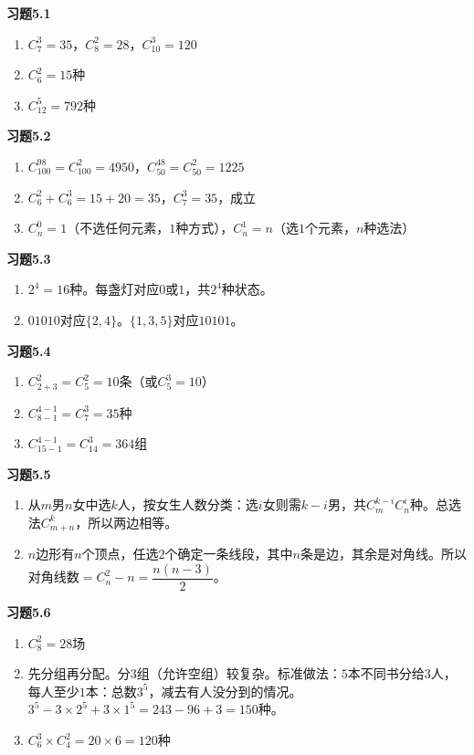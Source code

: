 
\textbf{习题5.1}
\begin{enumerate}
\item $C_7^3=35$，$C_8^2=28$，$C_{10}^3=120$
\item $C_6^2=15$种
\item $C_{12}^5=792$种
\end{enumerate}

\textbf{习题5.2}
\begin{enumerate}
\item $C_{100}^{98}=C_{100}^2=4950$，$C_{50}^{48}=C_{50}^2=1225$
\item $C_6^2+C_6^3=15+20=35$，$C_7^3=35$，成立
\item $C_n^0=1$（不选任何元素，$1$种方式），$C_n^1=n$（选$1$个元素，$n$种选法）
\end{enumerate}

\textbf{习题5.3}
\begin{enumerate}
\item $2^4=16$种。每盏灯对应$0$或$1$，共$2^4$种状态。
\item $01010$对应$\{2,4\}$。$\{1,3,5\}$对应$10101$。
\end{enumerate}

\textbf{习题5.4}
\begin{enumerate}
\item $C_{2+3}^2=C_5^2=10$条（或$C_{5}^3=10$）
\item $C_{8-1}^{4-1}=C_7^3=35$种
\item $C_{15-1}^{4-1}=C_{14}^3=364$组
\end{enumerate}

\textbf{习题5.5}
\begin{enumerate}
\item 从$m$男$n$女中选$k$人，按女生人数分类：选$i$女则需$k-i$男，共$C_m^{k-i}C_n^i$种。总选法$C_{m+n}^k$，所以两边相等。
\item $n$边形有$n$个顶点，任选$2$个确定一条线段，其中$n$条是边，其余是对角线。所以对角线数$=C_n^2-n=\dfrac{n(n-3)}{2}$。
\end{enumerate}

\textbf{习题5.6}
\begin{enumerate}
\item $C_8^2=28$场
\item 先分组再分配。分$3$组（允许空组）较复杂。标准做法：$5$本不同书分给$3$人，每人至少$1$本：总数$3^5$，减去有人没分到的情况。$3^5-3\times2^5+3\times1^5=243-96+3=150$种。
\item $C_6^3\times C_4^2=20\times6=120$种
\end{enumerate}


